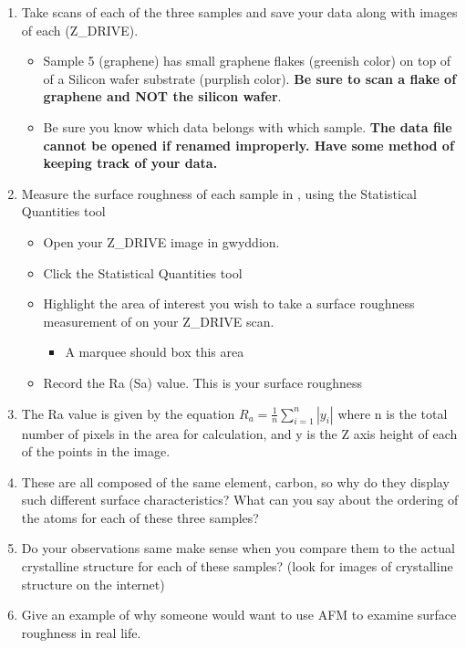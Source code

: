 \documentclass{../lab}
\begin{document}
\begin{enumerate}
    \item Take scans of each of the three samples and save your data along with images of each (Z\_DRIVE).

    \begin{itemize}
        \item Sample 5 (graphene) has small graphene flakes (greenish color) on top of of a Silicon wafer substrate (purplish color). \textbf{Be sure to scan a flake of graphene and NOT the silicon wafer}.

        \item Be sure you know which data belongs with which sample.  \textbf{The data file cannot be opened if renamed improperly. Have some method of keeping track of your data.}

    \end{itemize}

    \item Measure the surface roughness of each sample in \textbf{}, using the Statistical Quantities tool
    \begin{itemize}
        \item Open your Z\_DRIVE image in gwyddion.

        \item Click the Statistical Quantities tool

        \item Highlight the area of interest you wish to take a surface roughness measurement of on your Z\_DRIVE scan.

    \begin{itemize}
        \item A marquee should box this area

    \end{itemize}

        \item Record the Ra (Sa) value. This is your surface roughness

    \end{itemize}

    \item The Ra value is given by the equation $R_a=\frac{1}{n} \sum\limits_{i=1}^{n} |y_i|$ where n is the total number of pixels in the area for calculation, and y is the Z axis height of each of the points in the image.

    \item These are all composed of the same element, carbon, so why do they display such different surface characteristics? What can you say about the ordering of the atoms for each of these three samples?

    \item Do your observations same make sense when you compare them to the actual crystalline structure for each of these samples? (look for images of crystalline structure on the internet)

    \item Give an example of why someone would want to use AFM to examine surface roughness in real life.

\end{enumerate}
\end{document}
